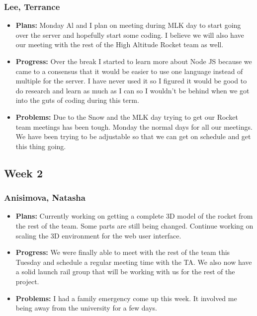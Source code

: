 \documentclass[10pt,draftclsnofoot,onecolumn]{IEEEtran}
\begin{document}
\subsubsection{Lee, Terrance}
\begin{itemize}
	\item \textbf{Plans: }
	Monday Al and I plan on meeting during MLK day to start going over the server and hopefully start some coding. I believe we will also have our meeting with the rest of the High Altitude Rocket team as well.
	\item \textbf{Progress: }
	Over the break I started to learn more about Node JS because we came to a consensus that it would be easier to use one language instead of multiple for the server. I have never used it so I figured it would be good to do research and learn as much as I can so I wouldn't be behind when we got into the guts of coding during this term.
	\item \textbf{Problems: }
	Due to the Snow and the MLK day trying to get our Rocket team meetings has been tough. Monday the normal days for all our meetings. We have been trying to be adjustable so that we can get on schedule and get this thing going.
\end{itemize}

\subsection{Week 2}
\subsubsection{Anisimova, Natasha}
\begin{itemize}
	\item \textbf{Plans: }
	Currently working on getting a complete 3D model of the rocket from the rest of the team. Some parts are still being changed. Continue working on scaling the 3D environment for the web user interface.
	\item \textbf{Progress: }
	We were finally able to meet with the rest of the team this Tuesday and schedule a regular meeting time with the TA. We also now have a solid launch rail group that will be working with us for the rest of the project.
	\item \textbf{Problems: }
	I had a family emergency come up this week. It involved me being away from the university for a few days.
\end{itemize}
\end{document}
